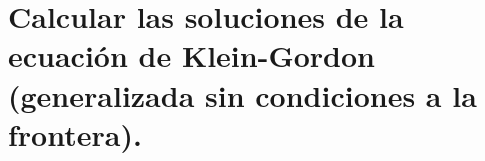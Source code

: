 \section{Calcular las soluciones de la ecuación de Klein-Gordon (generalizada sin condiciones a la
frontera).}
